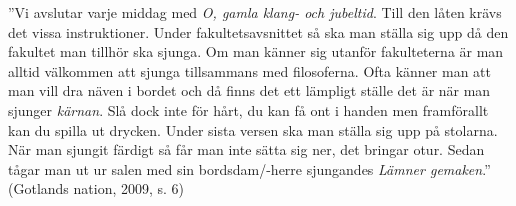 
''Vi avslutar varje middag med \emph{O, gamla klang- och jubeltid}. Till den låten krävs det vissa instruktioner. Under fakultetsavsnittet så ska man ställa sig upp då den fakultet man tillhör ska sjunga. Om man känner sig utanför fakulteterna är man alltid välkommen att sjunga tillsammans med filosoferna. Ofta känner man att man vill dra näven i bordet och då finns det ett lämpligt ställe det är när man sjunger \emph{kärnan}. Slå dock inte för hårt, du kan få ont i handen men framförallt kan du spilla ut drycken. Under sista versen ska man ställa sig upp på stolarna. När man sjungit färdigt så får man inte sätta sig ner, det bringar otur. Sedan tågar man ut ur salen med sin bordsdam/-herre sjungandes \emph{Lämner gemaken}.'' (Gotlands nation, 2009, s. 6)